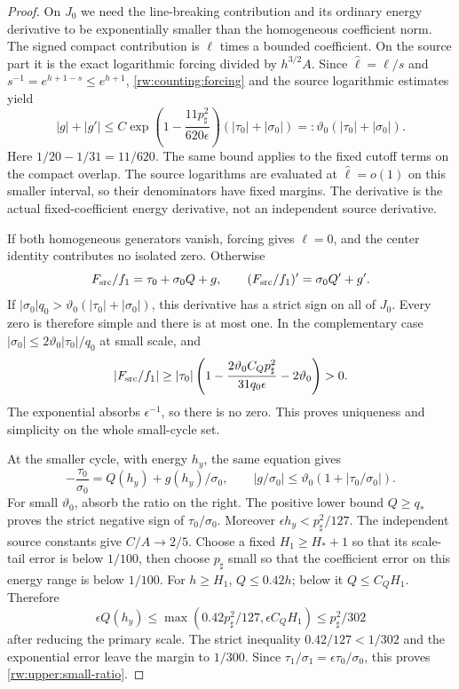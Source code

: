 \begin{proof}
On $J_0$ we need the line-breaking contribution and its ordinary
energy derivative to be exponentially smaller than the homogeneous
coefficient norm. The signed compact contribution is $\ell$ times a
bounded coefficient. On the source part it is the exact logarithmic
forcing divided by $h^{3/2}A$.
Since $\widehat\ell=\ell/s$ and $s^{-1}=e^{h+1-s}\le e^{h+1}$,
\eqref{rw:counting:forcing} and the source logarithmic estimates
yield
\begin{equation}\label{rw:upper:small-forcing}
 |g|+|g'|\le C\exp\left(1-\frac{11p_\sharp^2}{620\epsilon}\right)
                      (|\tau_0|+|\sigma_0|)
       =:\vartheta_0(|\tau_0|+|\sigma_0|).
\end{equation}
Here $1/20-1/31=11/620$. The same bound applies to the fixed cutoff
terms on the compact overlap. The source logarithms are evaluated at
$\widehat\ell=o(1)$ on this smaller interval, so their denominators
have fixed margins. The derivative is the actual fixed-coefficient
energy derivative, not an independent source derivative.

If both homogeneous generators vanish, forcing gives $\ell=0$,
and the center identity contributes no isolated zero. Otherwise
\[
 F_{\rm src}/f_1=\tau_0+\sigma_0Q+g,
 \qquad (F_{\rm src}/f_1)'=\sigma_0Q'+g'.
\]
If $|\sigma_0|q_0>\vartheta_0(|\tau_0|+|\sigma_0|)$,
this derivative has a strict sign on all of $J_0$. Every zero is
therefore simple and there is at most one. In the complementary
case $|\sigma_0|\le2\vartheta_0|\tau_0|/q_0$ at small scale,
and
\[
 |F_{\rm src}/f_1|\ge |\tau_0|
 \left(1-\frac{2\vartheta_0 C_Qp_\sharp^2}{31q_0\epsilon}
                         -2\vartheta_0\right)>0.
\]
The exponential absorbs $\epsilon^{-1}$, so there is no zero.
This proves uniqueness and simplicity on the whole small-cycle set.

At the smaller cycle, with energy $h_y$, the same equation gives
\[
 -\frac{\tau_0}{\sigma_0}
 =Q(h_y)+g(h_y)/\sigma_0,
 \qquad |g/\sigma_0|\le\vartheta_0(1+|\tau_0/\sigma_0|).
\]
For small $\vartheta_0$, absorb the ratio on the right. The positive
lower bound $Q\ge q_*$ proves the strict negative sign of
$\tau_0/\sigma_0$. Moreover $\epsilon h_y<p_\sharp^2/127$.
The independent source constants give $C/A\to2/5$. Choose a fixed
$H_1\ge H_*+1$ so that its scale-tail error is below $1/100$,
then choose $p_\sharp$ small so that the coefficient error on this
energy range is below $1/100$. For $h\ge H_1$, $Q\le0.42h$;
below it $Q\le C_QH_1$. Therefore
\[
 \epsilon Q(h_y)\le
 \max(0.42p_\sharp^2/127,\epsilon C_QH_1)
                    \le p_\sharp^2/302
\]
after reducing the primary scale. The strict inequality
$0.42/127<1/302$ and the exponential error leave the margin to
$1/300$. Since $\tau_1/\sigma_1=\epsilon\tau_0/\sigma_0$,
this proves \eqref{rw:upper:small-ratio}.


\end{proof}
